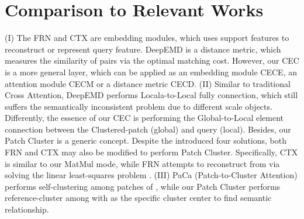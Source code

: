 \documentclass{article}
\begin{document}
\section{Comparison to Relevant Works}
(I) The FRN \cite{wertheimer2021few} and CTX \cite{doersch2020crosstransformers} are embedding modules, which uses support features to reconstruct or represent query feature. DeepEMD \cite{zhang2020deepemd} is a distance metric, which measures the similarity of pairs via the optimal matching cost. However, our CEC is a more general layer, which can be applied as an embedding module CECE, an attention module CECM or a distance metric CECD.
(II) Similar to traditional Cross Attention, DeepEMD performs Locala-to-Local fully connection, which still suffers the semantically inconsistent problem due to different scale objects. Differently, the essence of our CEC is performing the Global-to-Local element connection between the Clustered-patch  (global) and query  (local). Besides, our Patch Cluster is a generic concept. Despite the introduced four solutions, both FRN and CTX may also be modified to perform Patch Cluster.
Specifically, CTX is similar to our MatMul mode, while FRN attempts to reconstruct  from  via solving the linear least-squares problem .
(III) PaCa (Patch-to-Cluster Attention) \cite{grainger2022learning} performs self-clustering among patches of , while our Patch Cluster performs reference-cluster among  with  as the specific cluster center to  find semantic relationship.
\end{document}
